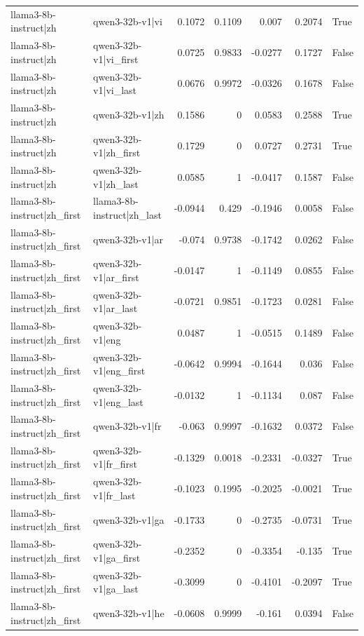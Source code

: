 \begin{table}
\begin{tabular}{l l r r r r l}
llama3-8b-instruct|zh & qwen3-32b-v1|vi & 0.1072 & 0.1109 & 0.007 & 0.2074 & True \\
llama3-8b-instruct|zh & qwen3-32b-v1|vi_first & 0.0725 & 0.9833 & -0.0277 & 0.1727 & False \\
llama3-8b-instruct|zh & qwen3-32b-v1|vi_last & 0.0676 & 0.9972 & -0.0326 & 0.1678 & False \\
llama3-8b-instruct|zh & qwen3-32b-v1|zh & 0.1586 & 0 & 0.0583 & 0.2588 & True \\
llama3-8b-instruct|zh & qwen3-32b-v1|zh_first & 0.1729 & 0 & 0.0727 & 0.2731 & True \\
llama3-8b-instruct|zh & qwen3-32b-v1|zh_last & 0.0585 & 1 & -0.0417 & 0.1587 & False \\
llama3-8b-instruct|zh_first & llama3-8b-instruct|zh_last & -0.0944 & 0.429 & -0.1946 & 0.0058 & False \\
llama3-8b-instruct|zh_first & qwen3-32b-v1|ar & -0.074 & 0.9738 & -0.1742 & 0.0262 & False \\
llama3-8b-instruct|zh_first & qwen3-32b-v1|ar_first & -0.0147 & 1 & -0.1149 & 0.0855 & False \\
llama3-8b-instruct|zh_first & qwen3-32b-v1|ar_last & -0.0721 & 0.9851 & -0.1723 & 0.0281 & False \\
llama3-8b-instruct|zh_first & qwen3-32b-v1|eng & 0.0487 & 1 & -0.0515 & 0.1489 & False \\
llama3-8b-instruct|zh_first & qwen3-32b-v1|eng_first & -0.0642 & 0.9994 & -0.1644 & 0.036 & False \\
llama3-8b-instruct|zh_first & qwen3-32b-v1|eng_last & -0.0132 & 1 & -0.1134 & 0.087 & False \\
llama3-8b-instruct|zh_first & qwen3-32b-v1|fr & -0.063 & 0.9997 & -0.1632 & 0.0372 & False \\
llama3-8b-instruct|zh_first & qwen3-32b-v1|fr_first & -0.1329 & 0.0018 & -0.2331 & -0.0327 & True \\
llama3-8b-instruct|zh_first & qwen3-32b-v1|fr_last & -0.1023 & 0.1995 & -0.2025 & -0.0021 & True \\
llama3-8b-instruct|zh_first & qwen3-32b-v1|ga & -0.1733 & 0 & -0.2735 & -0.0731 & True \\
llama3-8b-instruct|zh_first & qwen3-32b-v1|ga_first & -0.2352 & 0 & -0.3354 & -0.135 & True \\
llama3-8b-instruct|zh_first & qwen3-32b-v1|ga_last & -0.3099 & 0 & -0.4101 & -0.2097 & True \\
llama3-8b-instruct|zh_first & qwen3-32b-v1|he & -0.0608 & 0.9999 & -0.161 & 0.0394 & False \\

\end{tabular}
\end{table}
